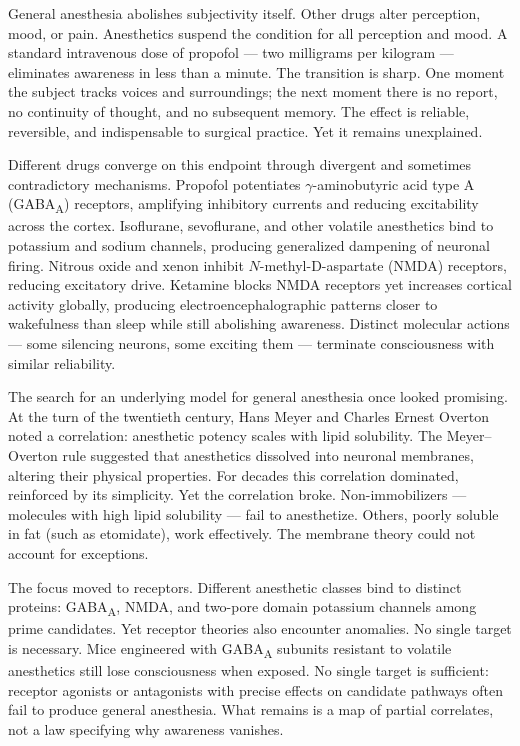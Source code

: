 General anesthesia abolishes subjectivity itself. Other drugs alter perception, mood, or pain. Anesthetics suspend the condition for all perception and mood. A standard intravenous dose of propofol — two milligrams per kilogram — eliminates awareness in less than a minute. The transition is sharp. One moment the subject tracks voices and surroundings; the next moment there is no report, no continuity of thought, and no subsequent memory. The effect is reliable, reversible, and indispensable to surgical practice. Yet it remains unexplained.

Different drugs converge on this endpoint through divergent and sometimes contradictory mechanisms. Propofol potentiates $\gamma$-aminobutyric acid type A (GABA\textsubscript{A}) receptors, amplifying inhibitory currents and reducing excitability across the cortex. Isoflurane, sevoflurane, and other volatile anesthetics bind to potassium and sodium channels, producing generalized dampening of neuronal firing. Nitrous oxide and xenon inhibit $N$-methyl-D-aspartate (NMDA) receptors, reducing excitatory drive. Ketamine blocks NMDA receptors yet increases cortical activity globally, producing electroencephalographic patterns closer to wakefulness than sleep while still abolishing awareness. Distinct molecular actions — some silencing neurons, some exciting them — terminate consciousness with similar reliability.

The search for an underlying model for general anesthesia once looked promising. At the turn of the twentieth century, Hans Meyer and Charles Ernest Overton noted a correlation: anesthetic potency scales with lipid solubility. The Meyer–Overton rule suggested that anesthetics dissolved into neuronal membranes, altering their physical properties. For decades this correlation dominated, reinforced by its simplicity. Yet the correlation broke. Non-immobilizers — molecules with high lipid solubility — fail to anesthetize. Others, poorly soluble in fat (such as etomidate), work effectively. The membrane theory could not account for exceptions.

The focus moved to receptors. Different anesthetic classes bind to distinct proteins: GABA\textsubscript{A}, NMDA, and two-pore domain potassium channels among prime candidates. Yet receptor theories also encounter anomalies. No single target is necessary. Mice engineered with GABA\textsubscript{A} subunits resistant to volatile anesthetics still lose consciousness when exposed. No single target is sufficient: receptor agonists or antagonists with precise effects on candidate pathways often fail to produce general anesthesia. What remains is a map of partial correlates, not a law specifying why awareness vanishes.

